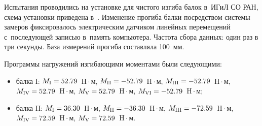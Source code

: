 Испытания проводились на установке для чистого изгиба балок в~ИГиЛ СО РАН, схема установки приведена в~\cite{iya:Larichkin}. Изменение прогиба балки посредством системы замеров фиксировалось электрическим датчиком линейных перемещений с~последующей записью в~память компьютера. Частота сбора данных: один раз в три секунды. База измерений прогиба составляла 100~мм. 

Программы нагружений изгибающими моментами были следующими: 

\begin{itemize}

\item[--]балка I: $M_{\rm I} = 52.79$~H${}\cdot{}$м, $M_{\rm II} = -52.79$~H${}\cdot{}$м, $M_{\rm III} = -52.79$~H${}\cdot{}$м, $M_{\rm IV} = 52.79$~H${}\cdot{}$м, $M_{\rm V} = 52.79$~H${}\cdot{}$м, $M_{\rm VI} = -52.79$~H${}\cdot{}$м; 

\item[--]балка II: $M_{\rm I} = 36.30$~H${}\cdot{}$м, $M_{\rm II} = -36.30$~H${}\cdot{}$м, $M_{\rm III} = -72.59$~H${}\cdot{}$м, $M_{\rm IV} = 72.59$~H${}\cdot{}$м, $M_{\rm V} = 72.59$~H${}\cdot{}$м.

\end{itemize}







